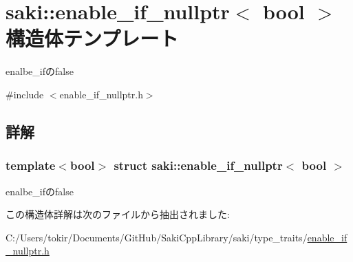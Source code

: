 \hypertarget{structsaki_1_1enable__if__nullptr}{}\section{saki\+:\+:enable\+\_\+if\+\_\+nullptr$<$ bool $>$ 構造体テンプレート}
\label{structsaki_1_1enable__if__nullptr}


enalbe\+\_\+ifのfalse  




{\ttfamily \#include $<$enable\+\_\+if\+\_\+nullptr.\+h$>$}



\subsection{詳解}
\subsubsection*{template$<$bool$>$\newline
struct saki\+::enable\+\_\+if\+\_\+nullptr$<$ bool $>$}

enalbe\+\_\+ifのfalse 

この構造体詳解は次のファイルから抽出されました\+:\begin{DoxyCompactItemize}
\item 
C\+:/\+Users/tokir/\+Documents/\+Git\+Hub/\+Saki\+Cpp\+Library/saki/type\+\_\+traits/\mbox{\hyperlink{enable__if__nullptr_8h}{enable\+\_\+if\+\_\+nullptr.\+h}}\end{DoxyCompactItemize}
